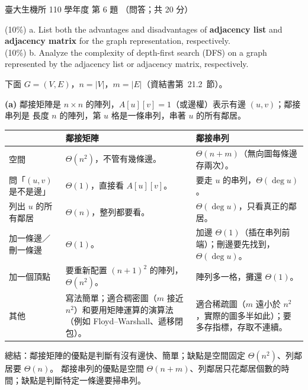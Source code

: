 \begin{pastexam}[label={px:ntu-110-bime-ds-06}]{臺大生機所 110 學年度 第 6 題}
（問答；共 20 分）

(10\%) a. List both the advantages and disadvantages of \textbf{adjacency list} and
\textbf{adjacency matrix} for the graph representation, respectively.\\
(10\%) b. Analyze the complexity of depth-first search (DFS) on a graph represented by the adjacency
list or adjacency matrix, respectively.
\end{pastexam}

\begin{pastsoln}
下面 $G = (V, E)$，$n = |V|$，$m = |E|$（資結書第~21.2~節）。

\textbf{(a)} 鄰接矩陣是 $n \times n$ 的陣列，$A[u][v] = 1$（或邊權）表示有邊 $(u, v)$；鄰接串列是
長度 $n$ 的陣列，第 $u$ 格是一條串列，串著 $u$ 的所有鄰居。
\begin{center}
\small
\begin{tabular}{p{}p{}p{}}
\toprule
 & 鄰接矩陣 & 鄰接串列 \\
\midrule
空間 & $\Theta(n^2)$，不管有幾條邊。 & $\Theta(n + m)$（無向圖每條邊存兩次）。 \\
問「$(u, v)$ 是不是邊」 & $\Theta(1)$，直接看 $A[u][v]$。 & 要走 $u$ 的串列，$\Theta(\deg u)$。 \\
列出 $u$ 的所有鄰居 & $\Theta(n)$，整列都要看。 & $\Theta(\deg u)$，只看真正的鄰居。 \\
加一條邊／刪一條邊 & $\Theta(1)$。 & 加邊 $\Theta(1)$（插在串列前端）；刪邊要先找到，$\Theta(\deg u)$。 \\
加一個頂點 & 要重新配置 $(n+1)^2$ 的陣列，$\Theta(n^2)$。 & 陣列多一格，攤還 $\Theta(1)$。 \\
其他 & 寫法簡單；適合稠密圖（$m$ 接近 $n^2$）和要用矩陣運算的演算法（例如 Floyd--Warshall、遞移閉包）。 & 適合稀疏圖（$m$ 遠小於 $n^2$，實際的圖多半如此）；要多存指標，存取不連續。 \\
\bottomrule
\end{tabular}
\end{center}
總結：鄰接矩陣的優點是判斷有沒有邊快、簡單；缺點是空間固定 $\Theta(n^2)$、列鄰居要 $\Theta(n)$。
鄰接串列的優點是空間 $\Theta(n + m)$、列鄰居只花鄰居個數的時間；缺點是判斷特定一條邊要掃串列。


\end{pastsoln}
